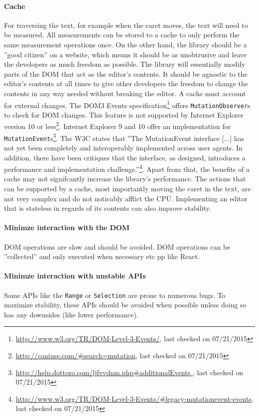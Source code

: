 \paragraph{Cache} For traversing the text, for example when the caret moves, the text will need to be measured. All measurements can be stored to a cache to only perform the same measurement operations once. On the other hand, the library should be a ''good citizen'' on a website, which means it should be as unobtrusive and leave the developers as much freedom as possible. The library will essentially modify parts of the DOM that act as the editor's contents. It should be agnostic to the editor's contents at all times to give other developers the freedom to change the contents in any way needed without breaking the editor. A cache must account for external changes. The DOM3 Events specification\footnote{\url{http://www.w3.org/TR/DOM-Level-3-Events/}, last checked on 07/21/2015} offers \texttt{MutationObserver}s to check for DOM changes. This feature is not supported by Internet Explorer version 10 or less\footnote{\url{http://caniuse.com/\#search=mutation}, last checked on 07/21/2015}. Internet Explorer 9 and 10 offer an implementation for \texttt{MutationEvent}s\footnote{\url{http://help.dottoro.com/ljfvvdnm.php\#additionalEvents }, last checked on 07/21/2015}. The W3C states that ''The MutationEvent interface [...] has not yet been completely and interoperably implemented across user agents. In addition, there have been critiques that the interface, as designed, introduces a performance and implementation challenge.''\footnote{\url{http://www.w3.org/TR/DOM-Level-3-Events/\#legacy-mutationevent-events}, last checked on 07/21/2015}. Apart from that, the benefits of a cache may not signifcantly increase the library's performance. The actions that can be supported by a cache, most importantly moving the caret in the text, are not very complex and do not noticably afflict the CPU. Implementing an editor that is stateless in regards of its contents can also improve stability.


\paragraph{Minimze interaction with the DOM} DOM operations are slow and should be avoided. DOM operations can be ''collected'' and only executed when necessary etc pp like React.

\paragraph{Minimze interaction with unstable APIs} Some APIs like the \texttt{Range} or \texttt{Selection} are prone to numerous bugs. To maximize stability, these APIs should be avoided when possible unless doing so has any downsides (like lower performance).

